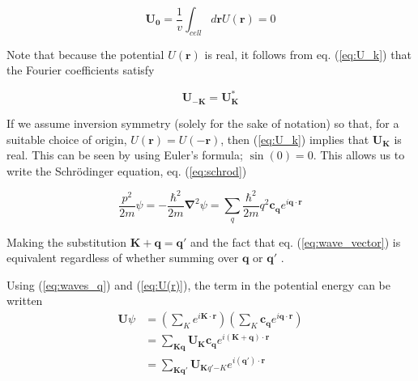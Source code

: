 	\begin{equation} \label{eq:U_0}
		\mathbf{U_0}
		=
		\frac{1}{v}
		\int_{cell}
		d \mathbf{r}
		U(\mathbf{r})
		= 0
	\end{equation}

	Note that because the potential $U(\mathbf{r})$ is real, it follows from eq. (\ref{eq:U_k}) that the Fourier coefficients satisfy

	\begin{equation} \label{eq:U_conj}
		\mathbf{U_{-K}} = \mathbf{U_{K}^*}
	\end{equation}

	If we assume inversion symmetry (solely for the sake of notation)  
	so that, for a suitable choice of origin, $U(\mathbf{r}) = U(-\mathbf{r})$, then (\ref{eq:U_k}) implies that $\mathbf{U_K}$ is real. This can be seen by using Euler's formula; $\sin(0) = 0$. This allows us to write  the Schrödinger equation, eq. (\ref{eq:schrod}) 

	\begin{equation} \label{eq:hamiltonian}
		\frac{p^2}{2m} \psi
		=
		-\frac{\hbar^2}{2m}
		\boldsymbol{\nabla}^2 \psi
		=
		\sum_{q} \frac{\hbar^2}{2m}
		q^2 \mathbf{c_q} 
		e^{i\mathbf{q} \cdot \mathbf{r}}
	\end{equation}

	Making the substitution $\mathbf{K+q=q'}$ and the fact that eq. (\ref{eq:wave_vector}) is equivalent regardless of whether summing over $\mathbf{q}$ or $\mathbf{q'}$ .

	Using (\ref{eq:waves_q}) and (\ref{eq:U(r)}), the term in the potential energy can be written 
	\begin{align} \label{eq:U_simpl1}
		\mathbf{U} \psi
		&=
		\left( \sum_{K}
		e^{i \mathbf{K} \cdot \mathbf{r}} \right)
		\left( \sum_{K} \mathbf{c_q}
		e^{i \mathbf{q} \cdot \mathbf{r}} \right) \\ \nonumber
		&=		
		\sum_{\mathbf{Kq}}
		\mathbf{U_Kc_q}
		e^{i(\mathbf{K+q}) \cdot \mathbf{r}} \\
		&=
		\sum_{\mathbf{Kq'}}
		\boldsymbol{U}_{{\mathbf{K}{q' {-K}}}}
		e^{i(\mathbf{q'}) \cdot \mathbf{r}}
	\end{align}


